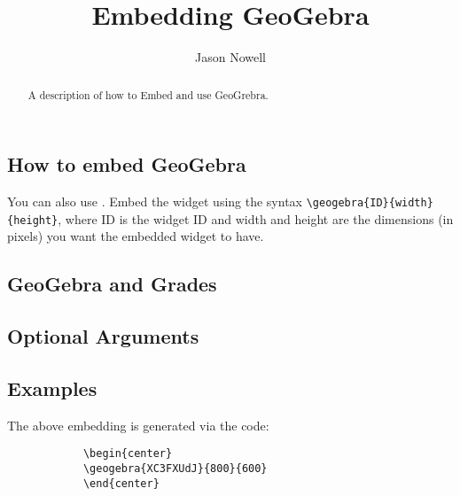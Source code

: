 \documentclass{ximera}
\title{Embedding GeoGebra}
\author{Jason Nowell}
\begin{document}
\begin{abstract}
    A description of how to Embed and use GeoGrebra.
\end{abstract}
\maketitle


    \subsection*{How to embed GeoGebra}

        You can also use . Embed the
        widget using the syntax \verb|\geogebra{ID}{width}{height}|, where ID
        is the widget ID and width and height are the dimensions (in pixels)
        you want the embedded widget to have.
        
        
    \subsection*{GeoGebra and Grades}
        
        

    \subsection*{Optional Arguments}
    
        

    \subsection*{Examples}
    
        \begin{center}
        \end{center}
        
        The above embedding is generated via the code:
        
        \begin{verbatim}
            \begin{center}
            \geogebra{XC3FXUdJ}{800}{600}
            \end{center}
        \end{verbatim}      
    
\end{document}
